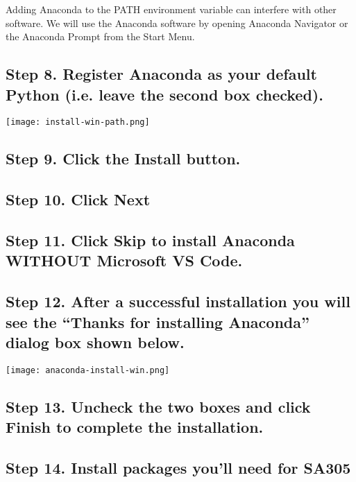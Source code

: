 \documentclass[12pt]{article}
\newcommand{\menu}[1]{{\bf #1}}
\begin{document}
Adding Anaconda to the PATH environment variable can interfere with other software.  We will use the Anaconda software by opening Anaconda Navigator or the Anaconda Prompt from the Start Menu.

\subsection*{Step 8. Register Anaconda as your default Python (i.e. leave the second box checked).}

\begin{center}
\texttt{[image: install-win-path.png]}
\end{center}

\subsection*{Step 9. Click the \menu{Install} button.}

\subsection*{Step 10. Click \menu{Next}}

\subsection*{Step 11. Click \menu{Skip} to install Anaconda WITHOUT Microsoft VS Code.}

\subsection*{Step 12. After a successful installation you will see the ``Thanks for installing Anaconda'' dialog box shown below.}

\begin{center}
\texttt{[image: anaconda-install-win.png]}
\end{center}

\subsection*{Step 13. Uncheck the two boxes and click \menu{Finish} to complete the installation.}

\subsection*{Step 14. Install packages you'll need for SA305}
\end{document}
